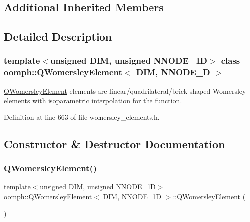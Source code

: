 \subsection*{Additional Inherited Members}


\subsection{Detailed Description}
\subsubsection*{template$<$unsigned D\+IM, unsigned N\+N\+O\+D\+E\+\_\+1D$>$\newline
class oomph\+::\+Q\+Womersley\+Element$<$ D\+I\+M, N\+N\+O\+D\+E\+\_\+D $>$}

\hyperlink{classoomph_1_1QWomersleyElement}{Q\+Womersley\+Element} elements are linear/quadrilateral/brick-\/shaped Womersley elements with isoparametric interpolation for the function. 

Definition at line 663 of file womersley\+\_\+elements.\+h.



\subsection{Constructor \& Destructor Documentation}
\mbox{\label{classoomph_1_1QWomersleyElement_a42dc522e6a7adb0b87e335a797d07bf4}} 
\subsubsection{\texorpdfstring{Q\+Womersley\+Element()}{QWomersleyElement()}\hspace{0.1cm}{\footnotesize\ttfamily [1/2]}}
{\footnotesize\ttfamily template$<$unsigned D\+IM, unsigned N\+N\+O\+D\+E\+\_\+1D$>$ \\
\hyperlink{classoomph_1_1QWomersleyElement}{oomph\+::\+Q\+Womersley\+Element}$<$ D\+IM, N\+N\+O\+D\+E\+\_\+1D $>$\+::\hyperlink{classoomph_1_1QWomersleyElement}{Q\+Womersley\+Element} (\begin{DoxyParamCaption}{ }\end{DoxyParamCaption})\hspace{0.3cm}{\ttfamily [inline]}}



